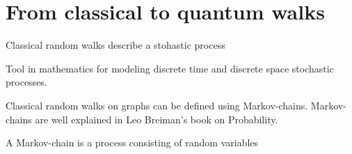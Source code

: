 \section{From classical to quantum walks}

Classical random walks describe a stohastic process

Tool in mathematics for modeling discrete time and discrete space stochastic processes.

Classical random walks on graphs can be defined using Markov-chains. Markov-chains
are well explained in Leo Breiman's book on Probability\cite{breiman_probability_1992}.

 A Markov-chain is a process consisting of random variables